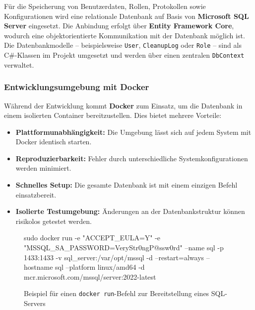 Für die Speicherung von Benutzerdaten, Rollen, Protokollen sowie Konfigurationen wird eine relationale Datenbank auf Basis von \textbf{Microsoft SQL Server} eingesetzt. Die Anbindung erfolgt über \textbf{Entity Framework Core}, wodurch eine objektorientierte Kommunikation mit der Datenbank möglich ist. Die Datenbankmodelle – beispielsweise \texttt{User}, \texttt{CleanupLog} oder \texttt{Role} – sind als C\#-Klassen im Projekt umgesetzt und werden über einen zentralen \texttt{DbContext} verwaltet.

\subsubsection*{Entwicklungsumgebung mit Docker}

Während der Entwicklung kommt \textbf{Docker} zum Einsatz, um die Datenbank in einem isolierten Container bereitzustellen. Dies bietet mehrere Vorteile:

\begin{itemize}
    \item \textbf{Plattformunabhängigkeit:} Die Umgebung lässt sich auf jedem System mit Docker identisch starten.
    \item \textbf{Reproduzierbarkeit:} Fehler durch unterschiedliche Systemkonfigurationen werden minimiert.
    \item \textbf{Schnelles Setup:} Die gesamte Datenbank ist mit einem einzigen Befehl einsatzbereit.
    \item \textbf{Isolierte Testumgebung:} Änderungen an der Datenbankstruktur können risikolos getestet werden.
\end{itemize}

\begin{figure}[H]
    \centering
    \begin{shellcode}
sudo docker run -e "ACCEPT_EULA=Y" -e "MSSQL_SA_PASSWORD=VeryStr0ngP@ssw0rd" --name sql -p 1433:1433 -v sql_server:/var/opt/mssql -d --restart=always --hostname sql --platform linux/amd64 -d mcr.microsoft.com/mssql/server:2022-latest
\end{shellcode}
    \caption{Beispiel für einen \texttt{docker run}-Befehl zur Bereitstellung eines SQL-Servers}
\end{figure}

